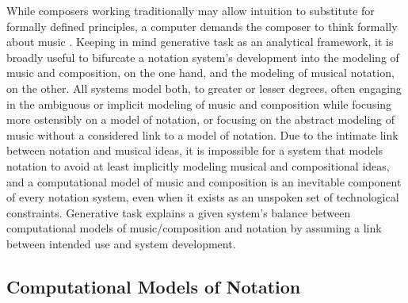 \documentclass{article}
\begin{document}
While composers working traditionally may allow intuition to substitute for
formally defined principles, a computer demands the composer to think formally
about music \cite{Xenakis:1992rq}. Keeping in mind generative task as an
analytical framework, it is broadly useful to bifurcate a  notation
system's development into the modeling of music and composition, on the one
hand, and the modeling of musical notation, on the other. All systems model
both, to greater or lesser degrees, often engaging in the ambiguous or implicit
modeling of music and composition while focusing more ostensibly on a model of
notation, or focusing on the abstract modeling of music without a considered
link to a model of notation. Due to the intimate link between notation and
musical ideas, it is impossible for a system that models notation to avoid at
least implicitly modeling musical and compositional ideas, and a computational
model of music and composition is an inevitable component of every
notation system, even when it exists as an unspoken set of technological
constraints. Generative task explains a given system's balance between
computational models of music/composition and notation by assuming a link
between intended use and system development.

\subsection{Computational Models of Notation}
\end{document}

